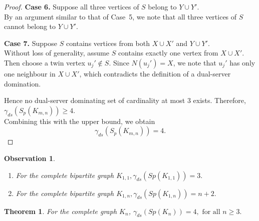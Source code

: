 \documentclass{article}
\newtheorem{theorem}{Theorem}[section]
\newtheorem{observation}{Observation}[section]
\begin{document}
\begin{proof}
\textbf{Case 6.}
Suppose all three vertices of $S$ belong to $Y\cup Y'$.\\
By an argument similar to that of  Case~5, we note that all three vertices of
$S$ cannot belong to $Y\cup Y'$.

\textbf{Case 7.}
Suppose $S$ contains vertices from both $X\cup X'$ and $Y\cup Y'$.\\
Without loss of generality, assume $S$ contains exactly one vertex from
$X\cup X'$. Then choose a twin vertex $u_j'\notin S$.
Since $N(u_j')=X$,
we note that $u_j'$ has only one neighbour in $X\cup X'$, which
contradicts the definition of a dual-server domination.

Hence no dual-server dominating set of cardinality at most 3 exists.
Therefore, $\gamma_{ds}(S_p(K_{m,n}))\ge 4.$\\
Combining this with the upper bound, we obtain \[
\gamma_{ds}(S_p(K_{m,n}))=  4.
\]
\end{proof}
\begin{observation}
\leavevmode
\begin{enumerate}
    \item{For the complete bipartite graph $K_{1,1}, \gamma_{ds}(Sp(K_{1,1}))= 3.$}
    \item{For the complete bipartite graph $K_{1,n}, \gamma_{ds}(Sp(K_{1,n}))= n+2.$}\end{enumerate}
\end{observation}
\begin{theorem}\label{SKN}
For the complete graph $K_n$, $
\gamma_{ds}(Sp(K_n)) = 4,  \text{ for all } n \ge 3.$
\end{theorem}
\end{document}
